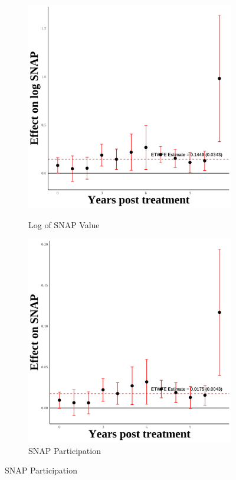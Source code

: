 \documentclass[12pt,english]{article}
\begin{document}
\begin{figure}[H]
  \begin{subfigure}[b]{0.3\textwidth}
    \centering
    \caption{Log of SNAP Value}
    \includegraphics[width=\linewidth]{figures/plot37-ln_snap_event_study-secgen-hw.png}
    \label{fig:ln-snap-secgen-hw}
  \end{subfigure}
  \hfill
  \begin{subfigure}[b]{0.3\textwidth}
    \centering
    \caption{SNAP Participation}
    \includegraphics[width=\linewidth]{figures/plot38-snap_event_study-secgen-hw.png}

\end{subfigure}
\end{figure}
\end{document}
